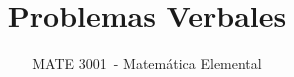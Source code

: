 \documentclass[12pt]{article}
\newcommand{\coursecode}{MATE 3001}      %
\newcommand{\coursename}{Matemática Elemental}     %
\newcommand{\lessontitle}{Problemas Verbales}    %
\newif\ifshowsolutions
\begin{document}
\title{\lessontitle}
\author{\coursecode\ - \coursename}
\date{}
\maketitle

\setcounter{section}{8}




\ifshowsolutions
    \newpage
    \section*{Soluciones}
    
\fi
\end{document}
